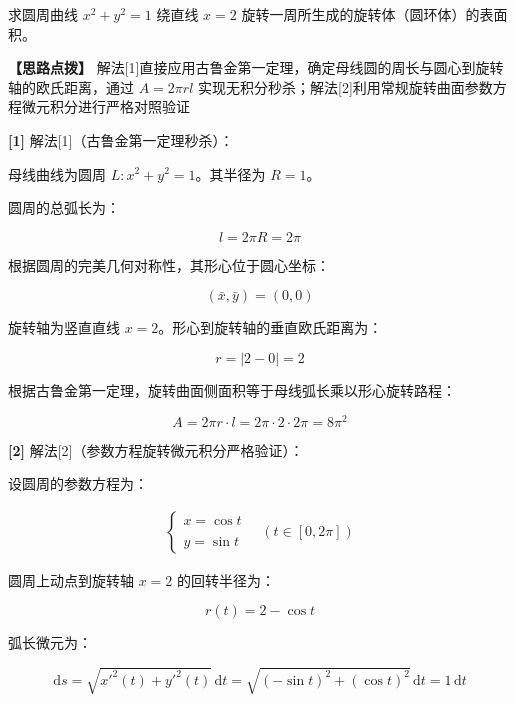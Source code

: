 \documentclass[11pt,a4paper,UTF8]{ctexart}
\begin{document}
求圆周曲线 $x^2 + y^2 = 1$ 绕直线 $x = 2$ 旋转一周所生成的旋转体（圆环体）的表面积。

\textbf{\color{DeepPurple}【思路点拨】} 解法[1]直接应用古鲁金第一定理，确定母线圆的周长与圆心到旋转轴的欧氏距离，通过 $A = 2\pi r l$ 实现无积分秒杀；解法[2]利用常规旋转曲面参数方程微元积分进行严格对照验证


\begin{solbox}[分步推导与答题规范]
\textbf{[1]} 解法[1]（古鲁金第一定理秒杀）：

母线曲线为圆周 $L: x^2 + y^2 = 1$。其半径为 $R = 1$。

圆周的总弧长为：


\begin{equation*}
l = 2\pi R = 2\pi
\end{equation*}


根据圆周的完美几何对称性，其形心位于圆心坐标：


\begin{equation*}
(\bar{x}, \bar{y}) = (0, 0)
\end{equation*}


旋转轴为竖直直线 $x = 2$。形心到旋转轴的垂直欧氏距离为：


\begin{equation*}
r = |2 - 0| = 2
\end{equation*}


根据古鲁金第一定理，旋转曲面侧面积等于母线弧长乘以形心旋转路程：


\begin{equation*}
A = 2\pi r \cdot l = 2\pi \cdot 2 \cdot 2\pi = 8\pi^2
\end{equation*}


\textbf{[2]} 解法[2]（参数方程旋转微元积分严格验证）：

设圆周的参数方程为：


\begin{align*}
\begin{cases} x = \cos t \\ \\ y = \sin t \end{cases} \quad (t \in [0, 2\pi])
\end{align*}


圆周上动点到旋转轴 $x = 2$ 的回转半径为：


\begin{equation*}
r(t) = 2 - \cos t
\end{equation*}


弧长微元为：


\begin{equation*}
\mathrm{d}s = \sqrt{x'^2(t) + y'^2(t)}\,\mathrm{d}t = \sqrt{(-\sin t)^2 + (\cos t)^2}\,\mathrm{d}t = 1\,\mathrm{d}t
\end{equation*}



\end{solbox}
\end{document}

